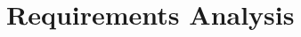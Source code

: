 \documentclass[]{article}
\begin{document}
\tableofcontents
\newpage


\newpage

\newpage

\newpage

\section{Requirements Analysis}\label{req-analysis}

\newpage


\newpage


\newpage



\nocite{*}
\end{document}

